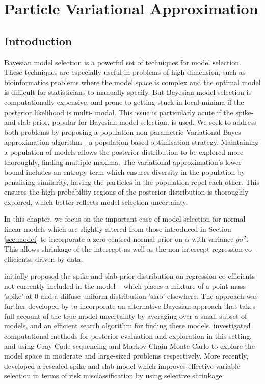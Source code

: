 \chapter{Particle Variational Approximation}

\setlength{\parindent}{0pt}

\section{Introduction}

Bayesian model selection is a powerful set of techniques for model selection. These techniques are especially
useful in problems of high-dimension, such as bioinformatics problems where the model space is complex and the
optimal model is difficult for statisticians to manually specify. But Bayesian model selection is
computationally expensive, and prone to getting stuck in local minima if the posterior likelihood is multi-
modal. This issue is particularly acute if the spike-and-slab prior, popular for Bayesian model
selection, is used. We seek to address both problems by proposing a population non-parametric Variational
Bayes approximation algorithm - a population-based optimisation strategy. Maintaining a population of models
allows the posterior distribution to be explored more thoroughly, finding multiple maxima. The variational
approximation's lower bound includes an entropy term which ensures diversity in the population by penalising
similarity,  having the particles in the population repel each other. This ensures the high probability
regions of the posterior distribution is thoroughly explored, which better reflects model selection
uncertainty.

In this chapter, we focus on the important case of model selection for normal linear models which
are slightly altered from those introduced in Section \ref{sec:model} to incorporate a zero-centred normal
prior on $\alpha$ with variance $g \sigma^2$. This allows shrinkage of the intercept as well as the
non-intercept regression co-efficients, driven by data.

\cite{Mitchell1988} initially proposed the spike-and-slab prior distribution on regression co-efficients not
currently included in the model -- which places a mixture of a point mass 'spike' at $0$ and a diffuse uniform
distribution 'slab' elsewhere. The approach was further developed by \cite{Madigan1994} to incorporate an
alternative Bayesian approach that takes full account of the true model uncertainty by averaging over a small
subset of models, and an efficient search algorithm for finding these models. \cite{George1997} investigated
computational methods for posterior evaluation and exploration in this setting, and using Gray Code sequencing
and Markov Chain Monte Carlo to explore the model space in moderate and large-sized problems respectively.
More recently, \cite{Ishwaran2005} developed a rescaled spike-and-slab model which improves effective variable
selection in terms of risk misclassification by using selective shrinkage.


